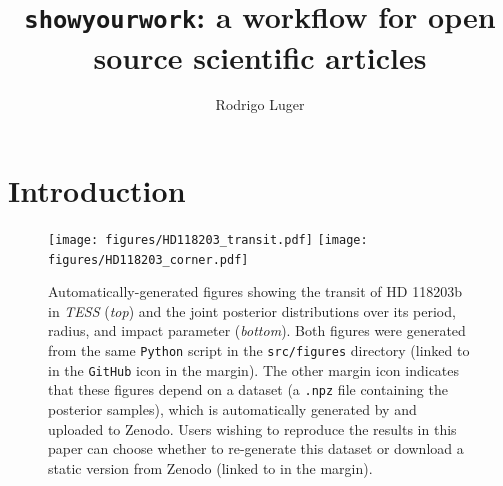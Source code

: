 \documentclass[twocolumn]{aastex631}
\begin{document}
\title{\texttt{showyourwork}: a workflow for open source scientific articles}

\author[0000-0002-0296-3826]{Rodrigo Luger}

\begin{abstract}
    \blindtext
\end{abstract}

\section{Introduction}
\Blindtext[4]


\begin{figure}[ht!]
    \begin{centering}
        \texttt{[image: figures/HD118203\_transit.pdf]}
        \texttt{[image: figures/HD118203\_corner.pdf]}
        \caption{
            Automatically-generated figures showing the transit of HD 118203b in \emph{TESS} (\emph{top}) and the joint posterior distributions over its period, radius, and impact parameter (\emph{bottom}). Both figures were generated from the same \texttt{Python} script in the \texttt{src/figures} directory (linked to in the \texttt{GitHub} icon in the margin). The other margin icon indicates that these figures depend on a dataset (a \texttt{.npz} file containing the posterior samples), 
            which is automatically generated by \showyourwork and uploaded to Zenodo. Users wishing to reproduce the results in this paper can choose whether to re-generate this dataset or download a static version from Zenodo (linked to in the margin).
        }
        \label{fig:HD118203}
    \end{centering}
\end{figure}
\end{document}
